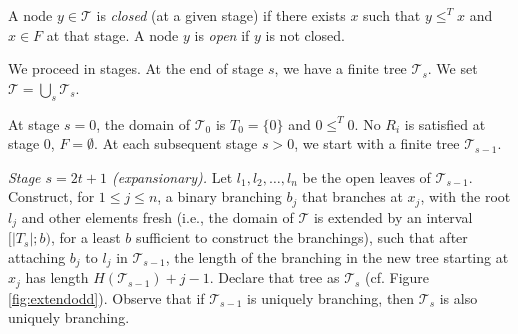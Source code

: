\documentclass[a4paper,UKenglish,cleveref, autoref, thm-restate]{lipics-v2021}
\begin{document}
          A node $y \in \mathcal T$ is \emph{closed} (at a given stage) if there exists $x$ such that $y \leq^T x$ and $x \in F$ at that stage. A node $y$ is \emph{open} if $y$ is not closed.



We proceed in stages. At the end of stage $s$, we have a finite tree $\mathcal T_s$. We set $\mathcal T = \bigcup_s \mathcal T_s$.

 At stage $s=0$, the domain of $\mathcal T_0$ is $T_0=\{0\}$ and $0 \leq^T 0$. No $R_i$ is satisfied at stage $0$, $F = \emptyset$. At each subsequent stage $s>0$, we start with a finite tree $\mathcal T_{s-1}$. 


\emph{Stage $s = 2t+1$ (expansionary).} Let $l_1, l_2, \dots, l_n$ be the open leaves of $\mathcal T_{s-1}$. Construct, for $1 \leq j \leq n$, a binary branching $b_j$ that branches at $x_j$, with the root $l_j$ and other elements fresh (i.e., the domain of $\mathcal T$ is extended by an interval $[|T_s|; b)$, for a least $b$ sufficient to construct the branchings), such that after attaching $b_j$ to $l_j$ in $\mathcal T_{s-1}$, the length of the branching in the new tree starting at $x_j$ has length $H(\mathcal T_{s-1}) + j - 1$. Declare that tree as $\mathcal T_s$ (cf. Figure \ref{fig:extendodd}). Observe that if $\mathcal T_{s-1}$ is uniquely branching, then $\mathcal T_s$ is also uniquely branching.
\end{document}
